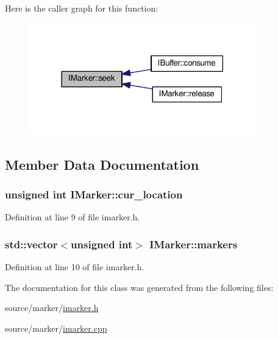 Here is the caller graph for this function\-:
\nopagebreak
\begin{figure}[H]
\begin{center}
\leavevmode
\includegraphics[width=278pt]{class_i_marker_a58086bbf091c5b49c15464a070fec171_icgraph}
\end{center}
\end{figure}




\subsection{Member Data Documentation}
\hypertarget{class_i_marker_adedaefcf6a1b1eac3d728a9d318dc618}{
\subsubsection[{cur\-\_\-location}]{\setlength{\rightskip}{0pt plus 5cm}unsigned int I\-Marker\-::cur\-\_\-location\hspace{0.3cm}{\ttfamily [protected]}}}\label{class_i_marker_adedaefcf6a1b1eac3d728a9d318dc618}


Definition at line 9 of file imarker.\-h.

\hypertarget{class_i_marker_a1c1b6ba790e3adf5fa8d9b24c06b10d7}{
\subsubsection[{markers}]{\setlength{\rightskip}{0pt plus 5cm}std\-::vector$<$unsigned int$>$ I\-Marker\-::markers\hspace{0.3cm}{\ttfamily [protected]}}}\label{class_i_marker_a1c1b6ba790e3adf5fa8d9b24c06b10d7}


Definition at line 10 of file imarker.\-h.



The documentation for this class was generated from the following files\-:\begin{DoxyCompactItemize}
\item 
source/marker/\hyperlink{imarker_8h}{imarker.\-h}\item 
source/marker/\hyperlink{imarker_8cpp}{imarker.\-cpp}\end{DoxyCompactItemize}
